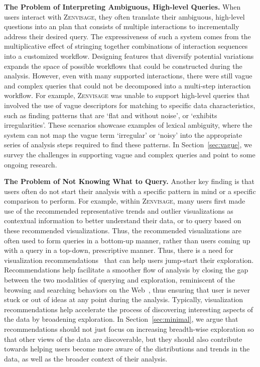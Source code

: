 \documentclass[11pt]{article}
\newcommand{\stitle}[1]{\par\noindent\textbf{#1}}
\newcommand{\zv}{\textsc{Zenvisage}\xspace}
\begin{document}
\stitle{The Problem of Interpreting Ambiguous, High-level Queries.}
When users interact with \zv, 
they often translate their ambiguous, 
high-level questions 
into an plan that consists of multiple interactions 
to incrementally address their desired query. 
The expressiveness of such a system 
comes from the multiplicative effect 
of stringing together combinations of 
interaction sequences into a customized workflow. 
Designing features that diversify potential 
variations expands the space of possible workflows 
that could be constructed during the analysis. 
However, even with many supported interactions, 
there were still vague and complex queries 
that could not be decomposed 
into a multi-step interaction workflow. 
For example, \zv was unable to support 
high-level queries that involved the use of vague 
descriptors for matching to specific data 
characteristics, such as finding patterns that 
are `flat and without noise', or `exhibits irregularities'. 
These scenarios showcase examples of lexical ambiguity, 
where the system can not map the vague term `irregular' or `noisy' 
into the appropriate series of analysis steps 
required to find these patterns. 
In Section~\ref{sec:vague}, we survey the challenges 
in supporting vague and complex queries 
and point to some ongoing research.

\stitle{The Problem of Not Knowing What to Query.}
Another key finding is that 
users often do not start their analysis 
with a specific pattern in mind or a specific comparison to perform. 
For example, within \zv, many users 
first made use of the recommended 
representative trends and outlier visualizations 
as contextual information 
to better understand their data, 
or to query based on these recommended visualizations.
Thus, the recommended visualizations
are often used to form queries in a bottom-up
manner, rather than users coming up with a query
in a top-down, prescriptive manner.
Thus, there is a need for visualization recommendations~\cite{Vartak2017}
that can help users jump-start their exploration.
Recommendations help facilitate a smoother flow
of analysis by closing the gap between the two modalities
of querying and exploration, 
reminiscent of the browsing and searching 
behaviors on the Web~\cite{Olston2003}, thus 
ensuring that user is never stuck or out of 
ideas at any point during the analysis. 
Typically, visualization recommendations help 
accelerate the process of discovering 
interesting aspects of the data by broadening exploration. 
In Section~\ref{sec:minimal}, we argue 
that recommendations should not just focus on 
increasing breadth-wise exploration
so that other views of the data are discoverable,
but they should also contribute
towards helping users become more aware of the 
distributions and trends in the data,
as well as the broader context of their analysis.
\end{document}
